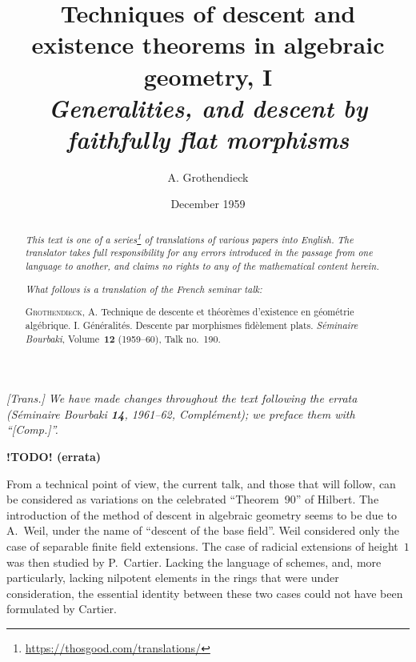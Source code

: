 \documentclass{article}
\title{Techniques of descent and existence theorems in algebraic geometry, I\\\emph{Generalities, and descent by faithfully flat morphisms}}
\author{A. Grothendieck}
\date{December 1959}
\theoremstyle{plain}
\theoremstyle{definition}
\newcommand{\todo}{\textbf{ !TODO! }}
\newcommand{\oldpage}[1]{\marginpar{\footnotesize$\Big\vert$ \textit{p.~#1}}}
\begin{document}
\maketitle
\thispagestyle{fancy}

\renewcommand{\abstractname}{Translator's note.}

\begin{abstract}
  \renewcommand*{\thefootnote}{\fnsymbol{footnote}}
  \emph{This text is one of a series\footnote{\url{https://thosgood.com/translations/}} of translations of various papers into English.}
  \emph{The translator takes full responsibility for any errors introduced in the passage from one language to another, and claims no rights to any of the mathematical content herein.}

  \medskip
  
  \emph{What follows is a translation of the French seminar talk:}

  \medskip\noindent
  \textsc{Grothendieck, A.}
  Technique de descente et th\'{e}or\`{e}mes d'existence en g\'{e}om\'{e}trie alg\'{e}brique. I. G\'{e}n\'{e}ralit\'{e}s. Descente par morphismes fid\`{e}lement plats.
  \emph{S\'{e}minaire Bourbaki}, Volume~\textbf{12} (1959--60), Talk no.~190.
\end{abstract}

\setcounter{footnote}{0}

\setcounter{tocdepth}{2}
\tableofcontents



\subsubsection*{}

\emph{[Trans.] We have made changes throughout the text following the errata (\emph{S\'{e}minaire Bourbaki} \textbf{14}, 1961--62, Compl\'{e}ment); we preface them with ``[Comp.]''.}
\medskip

\textbf{\todo(errata)}

\oldpage{190-01}
From a technical point of view, the current talk, and those that will follow, can be considered as variations on the celebrated ``Theorem~90'' of Hilbert.
The introduction of the method of descent in algebraic geometry seems to be due to A.~Weil, under the name of ``descent of the base field''.
Weil considered only the case of separable finite field extensions.
The case of radicial extensions of height~$1$ was then studied by P.~Cartier.
Lacking the language of schemes, and, more particularly, lacking nilpotent elements in the rings that were under consideration, the essential identity between these two cases could not have been formulated by Cartier.
\end{document}

